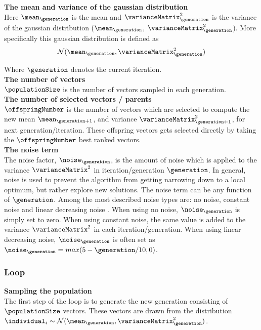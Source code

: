 \textbf{The mean and variance of the gaussian distribution} \\
Here $\mean_{\generation}$ is the mean and  
$\varianceMatrix^2_{\generation}$ is the variance 
of the gaussian distribution ($\mean_{\generation}$,
$\varianceMatrix^2_{\generation}$). 
More specifically this gaussian distribution is defined as 
\begin{align*}
\mathcal{N}(\mean_{\generation},\varianceMatrix^2_{\generation})
\end{align*}

Where $\generation$ denotes the current iteration.\\


\textbf{The number of vectors}\\
$\populationSize$ is the number of vectors sampled in each generation.
\\

\textbf{The number of selected vectors / parents}\\
$\offspringNumber$ is the number of vectors which are selected to compute 
the new mean $\mean_{\generation + 1}$, and variance
$\varianceMatrix^2_{\generation + 1}$, for next generation/iteration. 
These offspring vectors gets selected 
directly by taking the $\offspringNumber$ best ranked
vectors.
\\

\textbf{The noise term}\\
The noise factor, $\noise_{\generation}$, 
is the amount of noise which 
is applied to the variance $\varianceMatrix^2$ in
iteration/generation 
$\generation$. In general, noise is used to prevent
the algorithm from 
getting narrowing down to a local optimum, but
rather explore new solutions.
The noise term can be any
function of $\generation$. Among 
the most described noise types are: no noise, constant noise 
and linear decreasing noise \citep{szita:06}. 
When using no noise, $\noise_{\generation}$ 
is simply set to zero. When using constant noise, 
the same value is 
added to the variance $\varianceMatrix^2$ 
in each iteration/generation. 
When using linear decreasing noise, 
$\noise_{\generation}$ is often set as
$\noise_{\generation}=max(5- \generation /10,0)$.
\\

\subsubsection{Loop}

\textbf{Sampling the population}\\
The first step of the loop is to generate the new generation 
consisting of $\populationSize$ vectors. 
These vectors are drawn from the distribution 
$\individual_{i}\sim \mathcal{N}(\mean_{\generation},\varianceMatrix^2_{\generation})$.
\\

